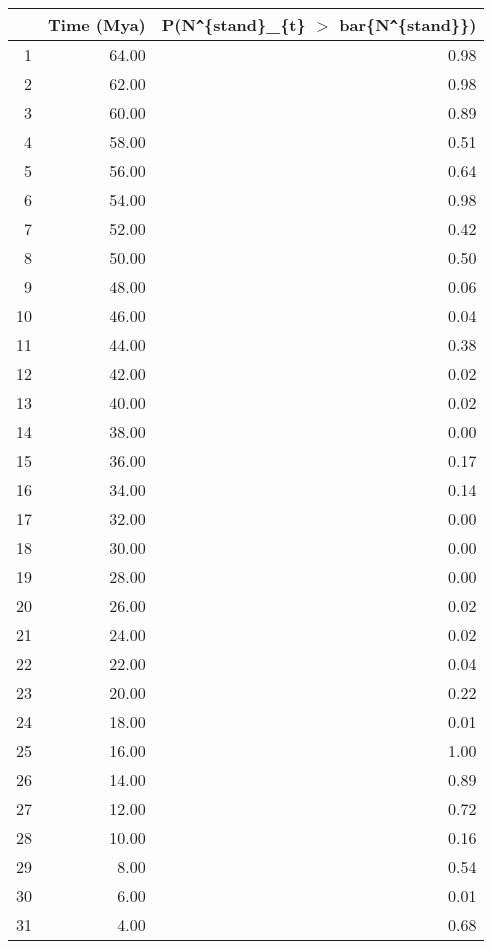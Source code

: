 \begin{table}[ht]
\centering
\begin{tabular}{rrr}
  \hline
 & Time (Mya) & P(N\verb|^|\{stand\}\_\{t\} $>$ bar\{N\verb|^|\{stand\}\}) \\ 
  \hline
1 & 64.00 & 0.98 \\ 
  2 & 62.00 & 0.98 \\ 
  3 & 60.00 & 0.89 \\ 
  4 & 58.00 & 0.51 \\ 
  5 & 56.00 & 0.64 \\ 
  6 & 54.00 & 0.98 \\ 
  7 & 52.00 & 0.42 \\ 
  8 & 50.00 & 0.50 \\ 
  9 & 48.00 & 0.06 \\ 
  10 & 46.00 & 0.04 \\ 
  11 & 44.00 & 0.38 \\ 
  12 & 42.00 & 0.02 \\ 
  13 & 40.00 & 0.02 \\ 
  14 & 38.00 & 0.00 \\ 
  15 & 36.00 & 0.17 \\ 
  16 & 34.00 & 0.14 \\ 
  17 & 32.00 & 0.00 \\ 
  18 & 30.00 & 0.00 \\ 
  19 & 28.00 & 0.00 \\ 
  20 & 26.00 & 0.02 \\ 
  21 & 24.00 & 0.02 \\ 
  22 & 22.00 & 0.04 \\ 
  23 & 20.00 & 0.22 \\ 
  24 & 18.00 & 0.01 \\ 
  25 & 16.00 & 1.00 \\ 
  26 & 14.00 & 0.89 \\ 
  27 & 12.00 & 0.72 \\ 
  28 & 10.00 & 0.16 \\ 
  29 & 8.00 & 0.54 \\ 
  30 & 6.00 & 0.01 \\ 
  31 & 4.00 & 0.68 \\ 
   \hline
\end{tabular}
\label{tab:div_peak}
\end{table}
